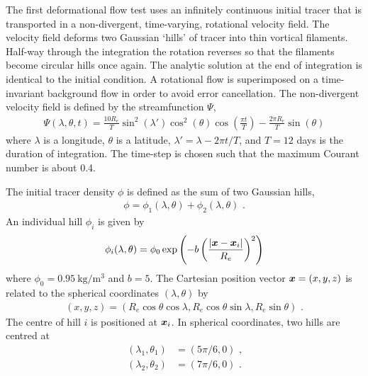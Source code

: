 The first deformational flow test uses an infinitely continuous initial tracer that is transported in a non-divergent, time-varying, rotational velocity field.
The velocity field deforms two Gaussian `hills' of tracer into thin vortical filaments.  Half-way through the integration the rotation reverses so that the filaments become circular hills once again.  The analytic solution at the end of integration is identical to the initial condition.
A rotational flow is superimposed on a time-invariant background flow in order to avoid error cancellation.
The non-divergent velocity field is defined by the streamfunction $\Psi$,
\begin{align}
	\Psi(\lambda, \theta, t) = \frac{10 R_e}{T} \sin^2 \left(\lambda'\right) \cos^2 \left(\theta\right) \cos \left( \frac{\pi t}{T} \right) - \frac{2 \pi R_e}{T} \sin\left(\theta\right)
\end{align}
where $\lambda$ is a longitude, $\theta$ is a latitude, $\lambda' = \lambda - 2 \pi t / T$, and $T = \num{12}$ days is the duration of integration.  The time-step is chosen such that the maximum Courant number is about 0.4.

The initial tracer density $\phi$ is defined as the sum of two Gaussian hills,
\begin{align}
	\phi = \phi_1(\lambda, \theta) + \phi_2(\lambda, \theta) \text{ .}
\end{align}
An individual hill $\phi_i$ is given by
\begin{align}
	\phi_i(\lambda, \theta) = \phi_0 \exp\left( -b \left( \frac{\left\lvert \bm{x} - \bm{x}_i \right\rvert}{R_e} \right)^2 \right)
\end{align}
where $\phi_0 = \SI{0.95}{\kilo\gram\per\meter\cubed}$ and $b = 5$.  The Cartesian position vector $\bm{x} = (x,y,z)$ is related to the spherical coordinates $(\lambda, \theta)$ by
\begin{align}
	(x,y,z) = (R_e \cos \theta \cos \lambda, R_e \cos \theta \sin \lambda, R_e \sin \theta) \label{eqn:cubicFit:spherical-cartesian} \text{ .}
\end{align}
The centre of hill $i$ is positioned at $\bm{x}_i$.  In spherical coordinates, two hills are centred at
\begin{align}
	(\lambda_1,\theta_1) &= (5 \pi /6, 0) \text{ ,} \\
	(\lambda_2,\theta_2) &= (7 \pi /6, 0) \text{ .}
\end{align}

